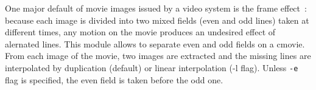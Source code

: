 One major default of movie images issued by a video system is the frame 
effect~: because each image is
divided into two mixed fields (even and odd lines) taken at different times, 
any motion on the movie produces an undesired effect of alernated lines.
This module allows to separate even and odd fields on a cmovie. From each image
of the movie, two images are extracted and the missing lines
are interpolated by duplication (default) or linear interpolation (-l flag).
Unless \verb+-e+ flag is specified, the even field is taken before the odd one.
